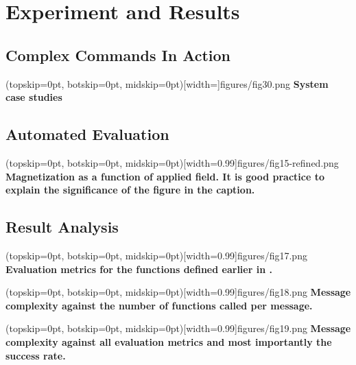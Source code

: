 \documentclass{ieeeaccess}
\begin{document}






\section{Experiment and Results}
\label{sec:experiment}

\subsection{Complex Commands In Action}
\Figure[t!](topskip=0pt, botskip=0pt,
midskip=0pt)[width=\textwidth]{{figures/fig30.png}}
{ \textbf{System case studies}\label{fig6}}


\subsection{Automated Evaluation}
\Figure[t!](topskip=0pt, botskip=0pt, midskip=0pt)[width=0.99\columnwidth]{{figures/fig15-refined.png}}
{ \textbf{Magnetization as a function of applied field.
It is good practice to explain the significance of the figure in the caption.}\label{fig6}}
\subsection{Result Analysis}

\Figure[t!](topskip=0pt, botskip=0pt,
midskip=0pt)[width=0.99\columnwidth]{{figures/fig17.png}}
{ \textbf{Evaluation metrics for the functions defined earlier in .}\label{fig7}}

\Figure[t!](topskip=0pt, botskip=0pt,
midskip=0pt)[width=0.99\columnwidth]{{figures/fig18.png}}
{ \textbf{Message complexity against the number of functions called per message.}\label{fig8}}

\Figure[t!](topskip=0pt, botskip=0pt,
midskip=0pt)[width=0.99\columnwidth]{{figures/fig19.png}}
{ \textbf{Message complexity against all evaluation metrics and most importantly the success rate.}\label{fig9}}


\end{document}
